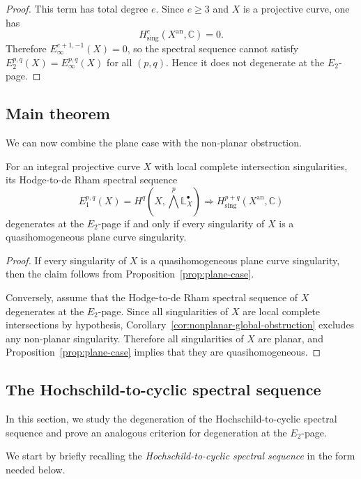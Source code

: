 \documentclass[12pt,reqno]{amsart}
\begin{document}
\begin{proof}
This term has total degree \(e\). Since \(e\ge 3\) and \(X\) is a projective curve, one has
\[
H^e_{\mathrm{sing}}(X^{\mathrm{an}},\mathbb C)=0.
\]
Therefore \(E_\infty^{e+1,-1}(X)=0\), so the spectral sequence cannot satisfy \(E_2^{p,q}(X)=E_\infty^{p,q}(X)\) for all \((p,q)\). Hence it does not degenerate at the \(E_2\)-page.
\end{proof}

\subsection{Main theorem}\label{subsec:main-theorem}

We can now combine the plane case with the non-planar obstruction.

\begin{theorem}\label{thm:main}
For an integral projective curve \(X\) with local complete intersection singularities, its Hodge-to-de Rham spectral sequence
\[
E_1^{p,q}(X)=H^q\!\left(X,\bigwedge^p\mathbb{L}^{\bullet}_X\right)
\Longrightarrow H^{p+q}_{\mathrm{sing}}(X^{\mathrm{an}},\mathbb C)
\]
degenerates at the \(E_2\)-page if and only if every singularity of \(X\) is a quasihomogeneous plane curve singularity.
\end{theorem}

\begin{proof}
If every singularity of \(X\) is a quasihomogeneous plane curve singularity, then the claim follows from Proposition~\ref{prop:plane-case}.

Conversely, assume that the Hodge-to-de Rham spectral sequence of \(X\) degenerates at the \(E_2\)-page. Since all singularities of \(X\) are local complete intersections by hypothesis, Corollary~\ref{cor:nonplanar-global-obstruction} excludes any non-planar singularity. Therefore all singularities of \(X\) are planar, and Proposition~\ref{prop:plane-case} implies that they are quasihomogeneous.
\end{proof}


\subsection{The Hochschild-to-cyclic spectral sequence}\label{subsec:HC}

In this section, we study the degeneration of the Hochschild-to-cyclic spectral sequence and prove an analogous criterion for degeneration at the \(E_2\)-page.

We start by briefly recalling the \emph{Hochschild-to-cyclic spectral sequence} in the form needed below.
\end{document}
